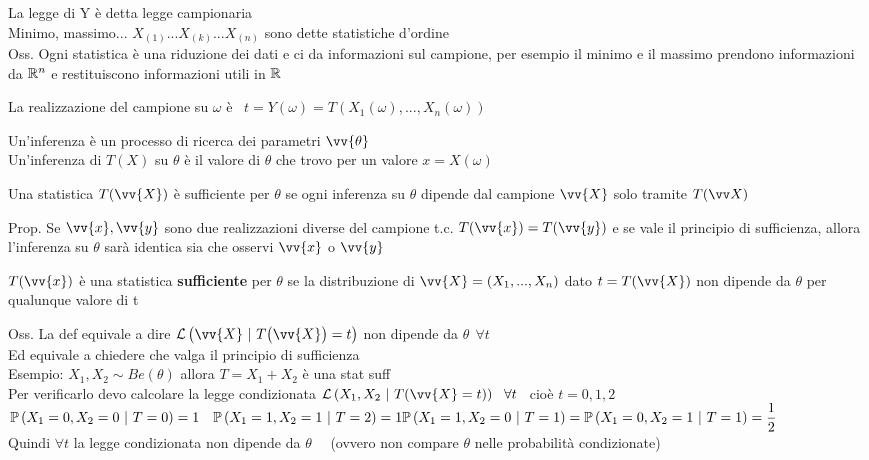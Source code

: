 La legge di Y è detta legge campionaria\\
Minimo, massimo... $X_{(1)} ... X_{(k)} ... X_{(n)}$ sono dette statistiche d'ordine\\
Oss. Ogni statistica è una riduzione dei dati e ci da informazioni sul campione, per esempio il minimo e il massimo prendono informazioni da $\mathbb R^n$ e  restituiscono informazioni utili in $\mathbb R$\\ 


La realizzazione del campione su $\omega$ è \ $t=Y(\omega)=T(X_1(\omega),...,X_n(\omega))$

Un'inferenza è un processo di ricerca dei parametri $\vv{\theta}$ \\
Un'inferenza di $T(X)$ su $\theta$ è il valore di $\theta$ che trovo per un valore $x=X(\omega)$ \\

\begin{teo}
Una statistica $T(\vv{X})$ è sufficiente per $\theta$ se ogni inferenza su $\theta$ dipende dal campione $\vv{X}$ solo tramite $T(\vv X)$ 
\end{teo}

\phantom{}

Prop. Se $\vv{x}, \vv{y}$ sono due realizzazioni diverse del campione t.c. $T(\vv{x})=T(\vv{y})$ e se vale il principio di sufficienza, allora l'inferenza su $\theta$ sarà identica sia che osservi $\vv{x}$ o $\vv{y}$\\

\begin{defi}
    $T(\vv{x})$ è una statistica \textbf{sufficiente} per $\theta$ se la distribuzione di $\vv{X}=(X_1,...,X_n)$ dato $t=T(\vv{X})$ non dipende da $\theta$ per qualunque valore di t
\end{defi}

Oss. La def equivale a dire $\Lc \O \vv{X} \ |\ T\big(\vv{X}\big)=t \C$ non dipende da $\theta \ \ \forall t$\\
Ed equivale a chiedere che valga il principio di sufficienza\\

Esempio: $X_1,X_2 \sim Be(\theta)$ allora $T=X_1+X_2$ è una stat suff\\
Per verificarlo devo calcolare la legge condizionata $\Lc \O X_1,X_2 \ | \ T(\vv{X}=t) \C  \ \ \forall t$ \ cioè $t=0,1,2$\\
$\prob{X_1=0,X_2=0 \ | \ T=0}=1 \ \ \ \prob{X_1=1, X_2=1 \ |\ T=2}=1 \\
\prob{X_1=1,X_2=0 \ |\ T=1}=\prob{X_1=0, X_2=1 \ |\ T=1}=\frac12$\\
Quindi $\forall t$ la legge condizionata non dipende da $\theta$ \ \ (ovvero non compare $\theta$ nelle probabilità condizionate) \\

